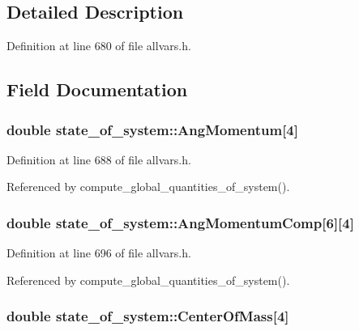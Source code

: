 \subsection{Detailed Description}


Definition at line 680 of file allvars.h.



\subsection{Field Documentation}
\hypertarget{structstate__of__system_a47635bc3c684637fff0c078223ae59fc}{
\subsubsection[{AngMomentum}]{\setlength{\rightskip}{0pt plus 5cm}double {\bf state\_\-of\_\-system::AngMomentum}\mbox{[}4\mbox{]}}}
\label{structstate__of__system_a47635bc3c684637fff0c078223ae59fc}


Definition at line 688 of file allvars.h.



Referenced by compute\_\-global\_\-quantities\_\-of\_\-system().

\hypertarget{structstate__of__system_a384a907f66c243418fbd02c317154c72}{
\subsubsection[{AngMomentumComp}]{\setlength{\rightskip}{0pt plus 5cm}double {\bf state\_\-of\_\-system::AngMomentumComp}\mbox{[}6\mbox{]}\mbox{[}4\mbox{]}}}
\label{structstate__of__system_a384a907f66c243418fbd02c317154c72}


Definition at line 696 of file allvars.h.



Referenced by compute\_\-global\_\-quantities\_\-of\_\-system().

\hypertarget{structstate__of__system_abdfe2ff074685ef9fdc4043beb898e98}{
\subsubsection[{CenterOfMass}]{\setlength{\rightskip}{0pt plus 5cm}double {\bf state\_\-of\_\-system::CenterOfMass}\mbox{[}4\mbox{]}}}
\label{structstate__of__system_abdfe2ff074685ef9fdc4043beb898e98}


